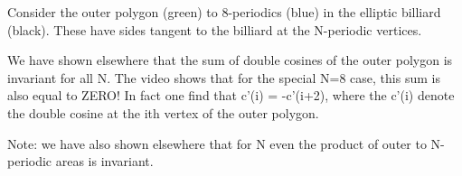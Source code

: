 Consider the outer polygon (green) to 8-periodics (blue) in the elliptic billiard (black). These have sides tangent to the billiard at the N-periodic vertices.

We have shown elsewhere that the sum of double cosines of the outer polygon is invariant for all N. The video shows that for the special N=8 case, this sum is also equal to ZERO! In fact one find that c'(i) = -c'(i+2), where the c'(i) denote the double cosine at the ith vertex of the outer polygon. 

Note: we have also shown elsewhere that for N even the product of outer to N-periodic areas is invariant.
